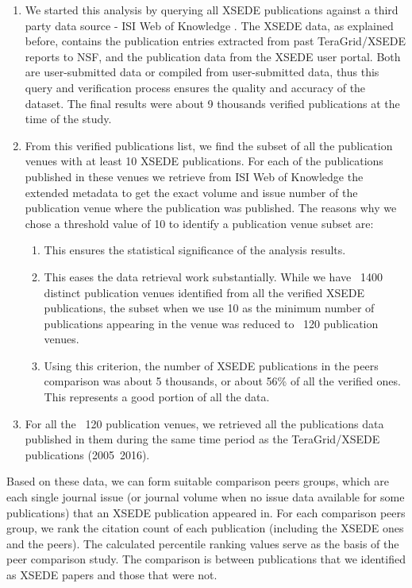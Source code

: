 \documentclass{sig-alternate}
\begin{document}
\begin{enumerate}
\item We started this analysis by querying all XSEDE publications against a third party
data source - ISI Web of Knowledge \cite{www-isiwos}. The XSEDE data, as explained before,
contains the publication entries extracted from past TeraGrid/XSEDE reports to NSF, and the
publication data from the XSEDE user portal. Both are user-submitted data or compiled from user-submitted
data, thus this query and verification process ensures the quality and accuracy of the dataset.
The final results were about 9 thousands verified publications at the time of the study.

\item From this verified publications list, we find the subset of all the publication venues with at least 10
XSEDE publications. For each of the publications published in these venues
we retrieve from ISI Web of Knowledge the extended metadata to get the exact volume and issue
number of the publication venue where the publication was published. The reasons why we chose
a threshold value of 10 to identify a publication venue subset are:
\begin{enumerate}
\item This ensures the statistical significance of the analysis results.
\item This eases the data retrieval work substantially. While we have ~1400 distinct publication
venues identified from all the verified XSEDE publications, the subset when we use 10 as the minimum
number of publications appearing in the venue was reduced to ~120 publication venues.
\item Using this criterion, the number of XSEDE publications in the peers comparison was about 5 thousands, or about
56\% of all the verified ones. This represents a good portion of all the data.
\end{enumerate}

\item For all the ~120 publication venues, we retrieved all the publications data published in them
during the same time period as the TeraGrid/XSEDE publications (2005~2016).
\end{enumerate}

Based on these data, we can form suitable comparison peers groups, which are each single
journal issue (or journal volume when no issue data available for some publications) that an XSEDE
publication appeared in. For each comparison peers group, we rank the
citation count of each publication (including the XSEDE ones and the peers). The calculated percentile
ranking values serve as the basis of the peer comparison study. The comparison is between publications
that we identified as XSEDE papers and those that were not.
\end{document}
